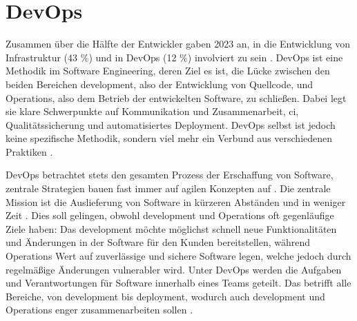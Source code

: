 \section{DevOps}
\label{sec:03-01_devops}

Zusammen über die Hälfte der Entwickler gaben 2023 an, in die Entwicklung von Infrastruktur (43 \%) und in DevOps (12 \%) involviert zu sein \cite{207:Developer-Ecosystem}. DevOps ist eine Methodik im Software Engineering, deren Ziel es ist, die Lücke zwischen den beiden Bereichen \Gls{development}, also der Entwicklung von Quellcode, und Operations, also dem Betrieb der entwickelten Software, zu schließen. Dabei legt sie klare Schwerpunkte auf Kommunikation und Zusammenarbeit, \acrlong{ci}, Qualitätssicherung und automatisiertes Deployment. DevOps selbst ist jedoch keine spezifische Methodik, sondern viel mehr ein Verbund aus verschiedenen Praktiken \cite{001:DevOps-Adoption-in-Software-Development}.

DevOps betrachtet stets den gesamten Prozess der Erschaffung von Software, zentrale Strategien bauen fast immer auf agilen Konzepten auf \cite{001:DevOps-Adoption-in-Software-Development}. Die zentrale Mission ist die Auslieferung von Software in kürzeren Abständen und in weniger Zeit \cite{006:Prevalence-of-GitOps-DevOps-in-Fast-CI-CD-Cycles}. Dies soll gelingen, obwohl \Gls{development} und Operations oft gegenläufige Ziele haben: Das \Gls{development} möchte möglichst schnell neue Funktionalitäten und Änderungen in der Software für den Kunden bereitstellen, während Operations Wert auf zuverlässige und sichere Software legen, welche jedoch durch regelmäßige Änderungen vulnerabler wird. Unter DevOps werden die Aufgaben und Verantwortungen für Software innerhalb eines Teams geteilt. Das betrifft alle Bereiche, von \Gls{development} bis \Gls{deployment}, wodurch auch \Gls{development} und Operations enger zusammenarbeiten sollen \cite{000:CI-CD-Deployment-in-DevOps-reduce-Gap-Developer-Operation}.

